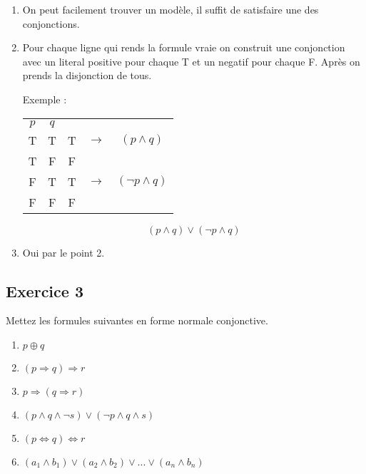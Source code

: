 \begin{enumerate}
	\item On peut facilement trouver un modèle, il suffit de satisfaire une des conjonctions.
	\item Pour chaque ligne qui rends la formule vraie on construit une conjonction avec un literal positive pour chaque T et un negatif pour chaque F. Après on prends la disjonction de tous.

	Exemple :


	\begin{tabular}{cc|ccc}
		$p$ & $q$ & &\\
		\cline{1-3}
		T&T&T&$\rightarrow$& $(p \land q)$\\
		T&F&F&&\\
		F&T&T&$\rightarrow$ & $(\neg p \land q)$\\
		F&F&F&&\\
	\end{tabular}

	$$ (p \land q) \lor (\neg p \land q)$$
	\item Oui par le point 2.
\end{enumerate}

\subsection*{Exercice 3}
Mettez les formules suivantes en forme normale conjonctive.
\begin{enumerate}
	\item $ p \oplus q$
	\item $ (p \Rightarrow q) \Rightarrow r  $
	\item $ p \Rightarrow (q \Rightarrow r)  $
	\item $ (p \land q \land \neg s)\lor (\neg p \land q \land s) $
	\item $ (p\Leftrightarrow q) \Leftrightarrow r $
	\item $ (a_1 \land b_1 ) \lor (a_2 \land b_2 ) \lor ... \lor (a_n \land b_n )  $

\end{enumerate}

